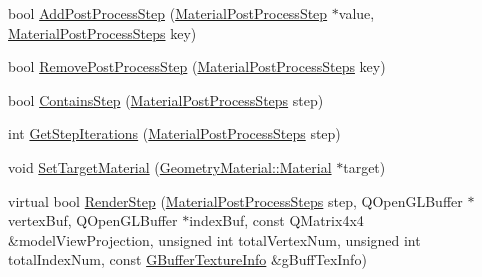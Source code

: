 \begin{DoxyCompactItemize}
\item 
bool \mbox{\hyperlink{class_geometry_engine_1_1_custom_shading_1_1_material_post_process_interface_a541da18512f4dd5fcc34ab221029e080}{Add\+Post\+Process\+Step}} (\mbox{\hyperlink{class_geometry_engine_1_1_custom_shading_1_1_material_post_process_step}{Material\+Post\+Process\+Step}} $\ast$value, \mbox{\hyperlink{namespace_geometry_engine_1_1_custom_shading_af8b09b91ca7086f4f67a5d4181f35e58}{Material\+Post\+Process\+Steps}} key)
\item 
bool \mbox{\hyperlink{class_geometry_engine_1_1_custom_shading_1_1_material_post_process_interface_a8cf7682e78a9a2db70b1204e620e0623}{Remove\+Post\+Process\+Step}} (\mbox{\hyperlink{namespace_geometry_engine_1_1_custom_shading_af8b09b91ca7086f4f67a5d4181f35e58}{Material\+Post\+Process\+Steps}} key)
\item 
bool \mbox{\hyperlink{class_geometry_engine_1_1_custom_shading_1_1_material_post_process_interface_a5c57e0728a681c3007fdc2b0359aca70}{Contains\+Step}} (\mbox{\hyperlink{namespace_geometry_engine_1_1_custom_shading_af8b09b91ca7086f4f67a5d4181f35e58}{Material\+Post\+Process\+Steps}} step)
\item 
int \mbox{\hyperlink{class_geometry_engine_1_1_custom_shading_1_1_material_post_process_interface_aea6152ec8a2a50e20d9045840cc6bce2}{Get\+Step\+Iterations}} (\mbox{\hyperlink{namespace_geometry_engine_1_1_custom_shading_af8b09b91ca7086f4f67a5d4181f35e58}{Material\+Post\+Process\+Steps}} step)
\item 
void \mbox{\hyperlink{class_geometry_engine_1_1_custom_shading_1_1_material_post_process_interface_a6e7643df80126a6b40e47bd4c79bf54f}{Set\+Target\+Material}} (\mbox{\hyperlink{class_geometry_engine_1_1_geometry_material_1_1_material}{Geometry\+Material\+::\+Material}} $\ast$target)
\item 
virtual bool \mbox{\hyperlink{class_geometry_engine_1_1_custom_shading_1_1_material_post_process_interface_a02fb160f9c92665cf2f644fbb65c5c71}{Render\+Step}} (\mbox{\hyperlink{namespace_geometry_engine_1_1_custom_shading_af8b09b91ca7086f4f67a5d4181f35e58}{Material\+Post\+Process\+Steps}} step, Q\+Open\+G\+L\+Buffer $\ast$vertex\+Buf, Q\+Open\+G\+L\+Buffer $\ast$index\+Buf, const Q\+Matrix4x4 \&model\+View\+Projection, unsigned int total\+Vertex\+Num, unsigned int total\+Index\+Num, const \mbox{\hyperlink{class_geometry_engine_1_1_g_buffer_texture_info}{G\+Buffer\+Texture\+Info}} \&g\+Buff\+Tex\+Info)
\item 
\mbox{\label{class_geometry_engine_1_1_custom_shading_1_1_material_post_process_interface_ac58496e874964aa65d6484b37fc44fcd}} 

\end{DoxyCompactItemize}
